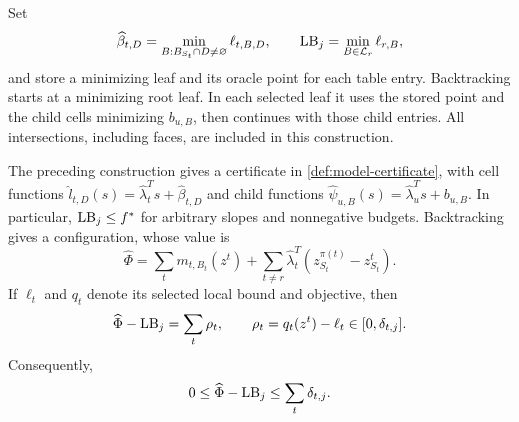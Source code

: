 Set
\begin{equation}
 \widehat\beta_{t,D}
     =\min_{B:B_{S_t}\cap D\ne\varnothing}\ell_{t,B,D},
 \qquad
 \mathrm{LB}_j=\min_{B\in\mathcal L_r}\ell_{r,B},
 \label{eq:inexact-dp}
\end{equation}
and store a minimizing leaf and its oracle point for each table entry.
Backtracking starts at a minimizing root leaf.  In each selected leaf it
uses the stored point and the child cells minimizing $b_{u,B}$, then
continues with those child entries.  All intersections, including faces,
are included in this construction.

\begin{proposition}
 \label{prop:inexact-dp}
The preceding construction gives a certificate in
\cref{def:model-certificate}, with cell functions
$\widehat l_{t,D}(s)=\widehat\lambda_t^Ts+\widehat\beta_{t,D}$ and
child functions $\widehat\psi_{u,B}(s)=\widehat\lambda_u^Ts+b_{u,B}$.
In particular, $\mathrm{LB}_j\le f^*$ for arbitrary slopes and nonnegative
budgets.  Backtracking gives a configuration, whose value is
\begin{equation}
 \widehat\Phi=\sum_t m_{t,B_t}(z^t)
       +\sum_{t\ne r}\widehat\lambda_t^T
                        (z^{\pi(t)}_{S_t}-z^t_{S_t}).
 \label{eq:inexact-configuration}
\end{equation}
If $\ell_t$ and $q_t$ denote its selected local bound and objective, then
\begin{equation}
 \widehat\Phi-\mathrm{LB}_j=\sum_t\rho_t,
 \qquad \rho_t=q_t(z^t)-\ell_t\in[0,\delta_{t,j}].
 \label{eq:inexact-residual}
\end{equation}
Consequently,
\begin{equation}
 0\le\widehat\Phi-\mathrm{LB}_j\le\sum_t\delta_{t,j}.
 \label{eq:inexact-backtrack}
\end{equation}
\end{proposition}

